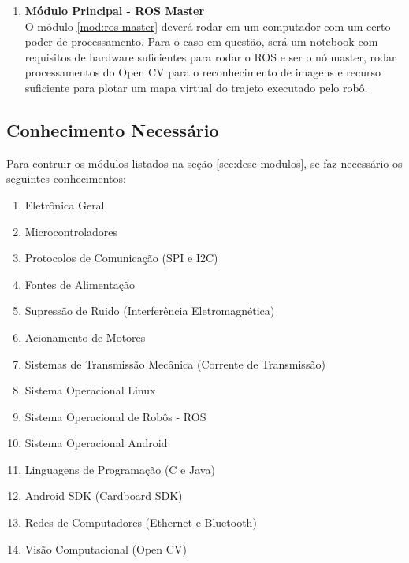 \documentclass[12pt,a4paper]{article}
\begin{document}
\begin{enumerate}
\item \textbf{Módulo Principal - ROS Master\label{mod:ros-master}}\\
	O módulo \ref{mod:ros-master} deverá rodar em um computador com um certo poder de processamento. Para o caso em questão, será um notebook com requisitos de hardware suficientes para rodar o ROS e ser o nó master, rodar processamentos do Open CV para o reconhecimento de imagens e recurso suficiente para plotar um mapa virtual do trajeto executado pelo robô. 
\end{enumerate}

\subsection{Conhecimento Necessário}
	Para contruir os módulos listados na seção \ref{sec:desc-modulos}, se faz necessário os seguintes conhecimentos:
\begin{enumerate}[noitemsep]
	\item Eletrônica Geral
	\item Microcontroladores
	\item Protocolos de Comunicação (SPI e I2C)
	\item Fontes de Alimentação
	\item Supressão de Ruido (Interferência Eletromagnética)
	\item Acionamento de Motores
	\item Sistemas de Transmissão Mecânica (Corrente de Transmissão)
	\item Sistema Operacional Linux
	\item Sistema Operacional de Robôs - ROS
	\item Sistema Operacional Android
	\item Linguagens de Programação (C e Java)
	\item Android SDK (Cardboard SDK)
	\item Redes de Computadores (Ethernet e Bluetooth)
	\item Visão Computacional (Open CV)
\end{enumerate}
\end{document}
